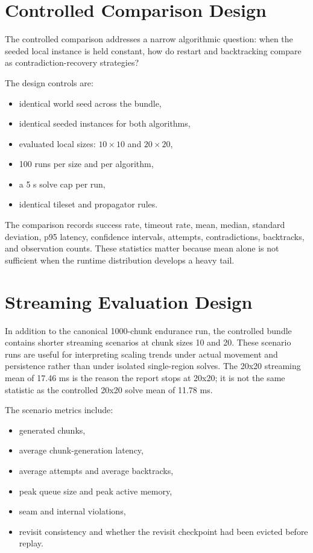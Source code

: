 \documentclass[12pt,a4paper]{report}
\begin{document}
\section{Controlled Comparison Design}
The controlled comparison addresses a narrow algorithmic question: when the seeded local instance is held constant, how do restart and backtracking compare as contradiction-recovery strategies?

The design controls are:
\begin{itemize}
\item identical world seed across the bundle,
\item identical seeded instances for both algorithms,
\item evaluated local sizes: $10 \times 10$ and $20 \times 20$,
\item 100 runs per size and per algorithm,
\item a 5 s solve cap per run,
\item identical tileset and propagator rules.
\end{itemize}

The comparison records success rate, timeout rate, mean, median, standard deviation, p95 latency, confidence intervals, attempts, contradictions, backtracks, and observation counts. These statistics matter because mean alone is not sufficient when the runtime distribution develops a heavy tail.

\section{Streaming Evaluation Design}
In addition to the canonical 1000-chunk endurance run, the controlled bundle contains shorter streaming scenarios at chunk sizes 10 and 20. These scenario runs are useful for interpreting scaling trends under actual movement and persistence rather than under isolated single-region solves. The 20x20 streaming mean of 17.46 ms is the reason the report stops at 20x20; it is not the same statistic as the controlled 20x20 solve mean of 11.78 ms.

The scenario metrics include:
\begin{itemize}
\item generated chunks,
\item average chunk-generation latency,
\item average attempts and average backtracks,
\item peak queue size and peak active memory,
\item seam and internal violations,
\item revisit consistency and whether the revisit checkpoint had been evicted before replay.
\end{itemize}
\end{document}
